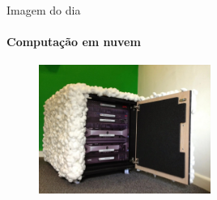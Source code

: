 \documentclass{beamer}
\begin{document}
\begin{frame}[fragile]{Imagem do dia}
      \framesubtitle{Computação em nuvem}
	\begin{figure}[H]
		\centerline{\includegraphics[width=0.5\textwidth]{assets/imagem-do-dia/nuvem-computador.jpeg}}

	\end{figure}
\end{frame}
\footlinecolor{}

\backmatter
\end{document}
